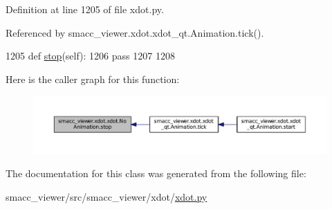 Definition at line 1205 of file xdot.\+py.



Referenced by smacc\+\_\+viewer.\+xdot.\+xdot\+\_\+qt.\+Animation.\+tick().


\begin{DoxyCode}
1205     \textcolor{keyword}{def }\hyperlink{classsmacc__viewer_1_1xdot_1_1xdot_1_1NoAnimation_ad9d904d2553b809b004fd19c2619a1f2}{stop}(self):
1206         \textcolor{keywordflow}{pass}
1207 
1208 
\end{DoxyCode}


Here is the caller graph for this function\+:
\nopagebreak
\begin{figure}[H]
\begin{center}
\leavevmode
\includegraphics[width=350pt]{classsmacc__viewer_1_1xdot_1_1xdot_1_1NoAnimation_ad9d904d2553b809b004fd19c2619a1f2_icgraph}
\end{center}
\end{figure}




The documentation for this class was generated from the following file\+:\begin{DoxyCompactItemize}
\item 
smacc\+\_\+viewer/src/smacc\+\_\+viewer/xdot/\hyperlink{xdot_8py}{xdot.\+py}\end{DoxyCompactItemize}
